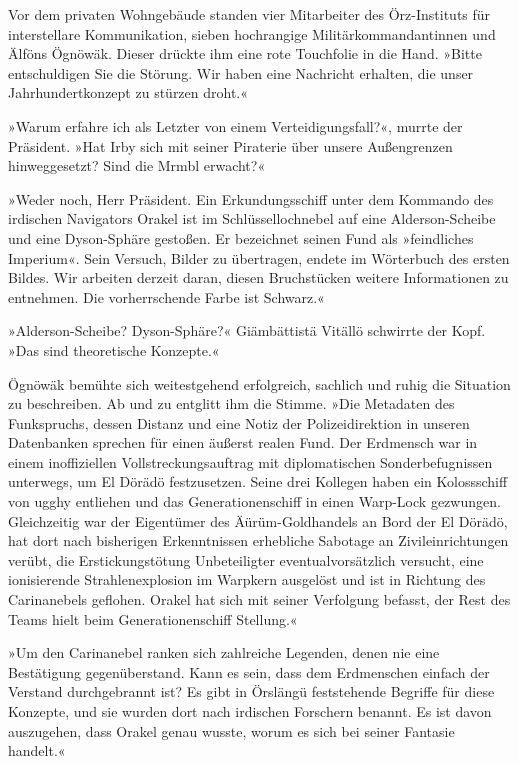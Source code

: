 Vor dem privaten Wohngebäude standen vier Mitarbeiter des Örz-Instituts für interstellare Kommunikation, sieben hochrangige Militärkommandantinnen und Älföns Ögnöwäk. Dieser drückte ihm eine rote Touchfolie in die Hand. »Bitte entschuldigen Sie die Störung. Wir haben eine Nachricht erhalten, die unser Jahrhundertkonzept zu stürzen droht.«

»Warum erfahre ich als Letzter von einem Verteidigungsfall?«, murrte der Präsident. »Hat Irby sich mit seiner Piraterie über unsere Außengrenzen hinweggesetzt? Sind die Mrmbl erwacht?«

»Weder noch, Herr Präsident. Ein Erkundungsschiff unter dem Kommando des irdischen Navigators Orakel ist im Schlüssellochnebel auf eine Alderson-Scheibe und eine Dyson-Sphäre gestoßen. Er bezeichnet seinen Fund als »feindliches Imperium«. Sein Versuch, Bilder zu übertragen, endete im Wörterbuch des ersten Bildes. Wir arbeiten derzeit daran, diesen Bruchstücken weitere Informationen zu entnehmen. Die vorherrschende Farbe ist Schwarz.«

»Alderson-Scheibe? Dyson-Sphäre?« Giämbättistä Vitällö schwirrte der Kopf. »Das sind theoretische Konzepte.«

Ögnöwäk bemühte sich weitestgehend erfolgreich, sachlich und ruhig die Situation zu beschreiben. Ab und zu entglitt ihm die Stimme. »Die Metadaten des Funkspruchs, dessen Distanz und eine Notiz der Polizeidirektion in unseren Datenbanken sprechen für einen äußerst realen Fund. Der Erdmensch war in einem inoffiziellen Vollstreckungsauftrag mit diplomatischen Sonderbefugnissen unterwegs, um El Dörädö festzusetzen. Seine drei Kollegen haben ein Kolossschiff von ugghy entliehen und das Generationenschiff in einen Warp-Lock gezwungen. Gleichzeitig war der Eigentümer des Äürüm-Goldhandels an Bord der El Dörädö, hat dort nach bisherigen Erkenntnissen erhebliche Sabotage an Zivileinrichtungen verübt, die Erstickungstötung Unbeteiligter eventualvorsätzlich versucht, eine ionisierende Strahlenexplosion im Warpkern ausgelöst und ist in Richtung des Carinanebels geflohen. Orakel hat sich mit seiner Verfolgung befasst, der Rest des Teams hielt beim Generationenschiff Stellung.«

»Um den Carinanebel ranken sich zahlreiche Legenden, denen nie eine Bestätigung gegenüberstand. Kann es sein, dass dem Erdmenschen einfach der Verstand durchgebrannt ist? Es gibt in Örslängü feststehende Begriffe für diese Konzepte, und sie wurden dort nach irdischen Forschern benannt. Es ist davon auszugehen, dass Orakel genau wusste, worum es sich bei seiner Fantasie handelt.«

